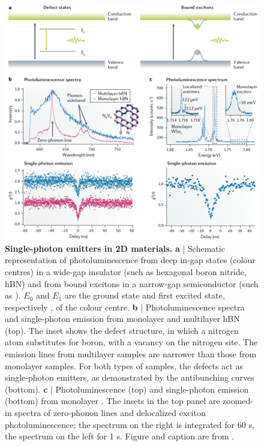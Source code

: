 \documentclass[]{article}
\begin{document}
\begin{figure}[h!tb]
	\centering
	\includegraphics[width = \textwidth]{hbn_properties.PNG}
	\caption{\textbf{Single-photon emitters in 2D materials.} \textbf{a} | Schematic representation of photoluminescence from deep in-gap states (colour centres) in a wide-gap insulator (such as hexagonal boron nitride, hBN) and from bound excitons in a narrow-gap semiconductor (such as ). $E_0$ and $E_1$ are the ground state and first excited state, respectively , of the colour centre. \textbf{b} | Photoluminescence spectra and single-photon emission from monolayer and multilayer hBN (top).	The inset shows the  defect structure, in which a nitrogen atom substitutes for boron, with a vacancy on the nitrogen site. The emission lines from multilayer samples are narrower than those from monolayer samples. For both	types of samples, the defects act as single-photon emitters, as demonstrated by the antibunching curves (bottom). \textbf{c} | Photoluminescence (top) and single-photon emission (bottom) from monolayer . The insets in the top panel are zoomed-in spectra of zero-phonon lines and delocalized exciton photoluminescence; the spectrum on the right is integrated for 60 s, the spectrum on the left for 1 s. Figure and caption are from \cite{2D_materials_for_quantum_information_science}.}
	\label{fig: hbn_properties}
\end{figure}
\end{document}
